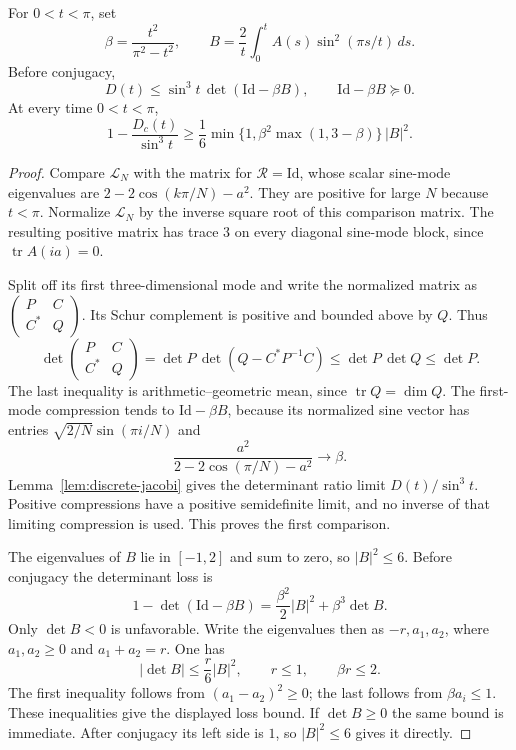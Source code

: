 \begin{lemma}\label{lem:upper-radial}
For $0<t<\pi$, set
\[
 \beta=\frac{t^2}{\pi^2-t^2},\qquad
 B=\frac2t\int_0^t A(s)\sin^2(\pi s/t)\,ds.
\]
Before conjugacy,
\[
 D(t)\le\sin^3t\,\det(\mathrm{Id}-\beta B),
 \qquad \mathrm{Id}-\beta B\succeq0.
\]
At every time $0<t<\pi$,
\[
 1-\frac{D_c(t)}{\sin^3t}
 \ge\frac16\min\{1,\beta^2\max(1,3-\beta)\}\,|B|^2.
\]
\end{lemma}
\begin{proof}
Compare $\mathcal L_N$ with the matrix for $\mathcal R=\mathrm{Id}$,
whose scalar sine-mode eigenvalues are
$2-2\cos(k\pi/N)-a^2$.  They are positive for large $N$ because $t<\pi$.
Normalize $\mathcal L_N$ by the inverse square root of this comparison
matrix.  The resulting positive matrix has trace $3$ on every diagonal
sine-mode block, since $\operatorname{tr}A(ia)=0$.

Split off its first three-dimensional mode and write the normalized
matrix as
$\left(\begin{smallmatrix}P&C\\C^*&Q\end{smallmatrix}\right)$.
Its Schur complement is positive and bounded above by $Q$.  Thus
\[
 \det\begin{pmatrix}P&C\\C^*&Q\end{pmatrix}
 =\det P\,\det(Q-C^*P^{-1}C)
 \le\det P\,\det Q\le\det P.
\]
The last inequality is arithmetic--geometric mean, since
$\operatorname{tr}Q=\dim Q$.  The first-mode compression tends to
$\mathrm{Id}-\beta B$, because its normalized sine vector has entries
$\sqrt{2/N}\sin(\pi i/N)$ and
\[
 \frac{a^2}{2-2\cos(\pi/N)-a^2}\longrightarrow\beta.
\]
Lemma~\ref{lem:discrete-jacobi} gives the determinant ratio limit
$D(t)/\sin^3t$.  Positive compressions have a positive semidefinite
limit, and no inverse of that limiting compression is used.
This proves the first comparison.

The eigenvalues of $B$ lie in $[-1,2]$ and sum to zero, so $|B|^2\le6$.
Before conjugacy the determinant loss is
\[
 1-\det(\mathrm{Id}-\beta B)
 =\frac{\beta^2}{2}|B|^2+\beta^3\det B.
\]
Only $\det B<0$ is unfavorable.  Write the eigenvalues then as
$-r,a_1,a_2$, where $a_1,a_2\ge0$ and $a_1+a_2=r$.
One has
\[
 |\det B|\le\frac r6|B|^2,\qquad r\le1,\qquad\beta r\le2.
\]
The first inequality follows from $(a_1-a_2)^2\ge0$; the last follows
from $\beta a_i\le1$.  These inequalities give the displayed loss bound.
If $\det B\ge0$ the same bound is immediate.  After conjugacy its left
side is $1$, so $|B|^2\le6$ gives it directly.
\end{proof}

